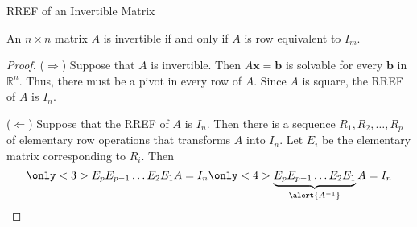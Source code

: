 \documentclass[xcolor=dvipsnames,aspectratio=169,t]{beamer}
\begin{document}
% 
% 


\begin{frame}{RREF of an Invertible Matrix}
  \begin{theorem}
    An $n\times n$ matrix $A$ is invertible if and only if $A$ is row equivalent to $I_m$.
  \end{theorem}
  
  \begin{proof}
  \pause
  (\alert{$\Rightarrow$})
    Suppose that $A$ is invertible.
    Then $A\mathbf{x}=\mathbf{b}$ is solvable for every $\mathbf{b}$ in $\mathbb{R}^n$.
    Thus, there must be a pivot in every row of $A$.
    Since $A$ is square, the RREF of $A$ is $I_n$.
  \bigskip
    
  \pause
  (\alert{$\Leftarrow$})
    Suppose that the RREF of $A$ is $I_n$.
    Then there is a sequence $R_1,R_2,\dots,R_p$ of elementary row operations that transforms $A$ into $I_n$.
    Let $E_i$ be the elementary matrix corresponding to $R_i$.
    Then 
    \[
      \only<3>{E_p E_{p-1} \dots E_2 E_1 A = I_n}
      \only<4>{\underbrace{E_p E_{p-1} \dots E_2 E_1}_{\alert{A^{-1}}} A = I_n}
    \]
  \end{proof}
  
\end{frame}
\end{document}
